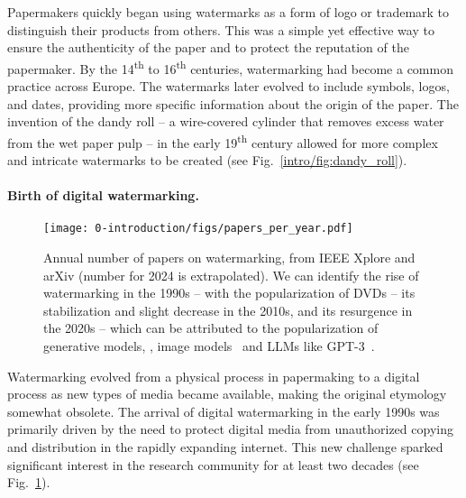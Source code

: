 Papermakers quickly began using watermarks as a form of logo or trademark to distinguish their products from others. 
This was a simple yet effective way to ensure the authenticity of the paper and to protect the reputation of the papermaker.
By the 14\textsuperscript{th} to 16\textsuperscript{th} centuries, watermarking had become a common practice across Europe. 
The watermarks later evolved to include symbols, logos, and dates, providing more specific information about the origin of the paper.
The invention of the dandy roll -- a wire-covered cylinder that removes excess water from the wet paper pulp -- in the early 19\textsuperscript{th} century allowed for more complex and intricate watermarks to be created (see Fig.~\ref{intro/fig:dandy_roll}).



\paragraph*{Birth of digital watermarking.}

\begin{figure}[b!]
    \centering
    \texttt{[image: 0-introduction/figs/papers\_per\_year.pdf]}
    \caption{
        Annual number of papers on watermarking, from IEEE Xplore and arXiv (number for 2024 is extrapolated). 
        We can identify the rise of watermarking in the 1990s -- with the popularization of DVDs -- its stabilization and slight decrease in the 2010s, and its resurgence in the 2020s -- which can be attributed to the popularization of generative models, \eg, image models~\citep{karras2020analyzing,ho2020denoising} and LLMs like GPT-3~\citep{brown2020language}.
    }
    \label{intro/fig:num_papers}
\end{figure}

Watermarking evolved from a physical process in papermaking to a digital process as new types of media became available, making the original etymology somewhat obsolete. 
The arrival of digital watermarking in the early 1990s was primarily driven by the need to protect digital media from unauthorized copying and distribution in the rapidly expanding internet. 
This new challenge sparked significant interest in the research community for at least two decades (see Fig.~\ref{intro/fig:num_papers}).

